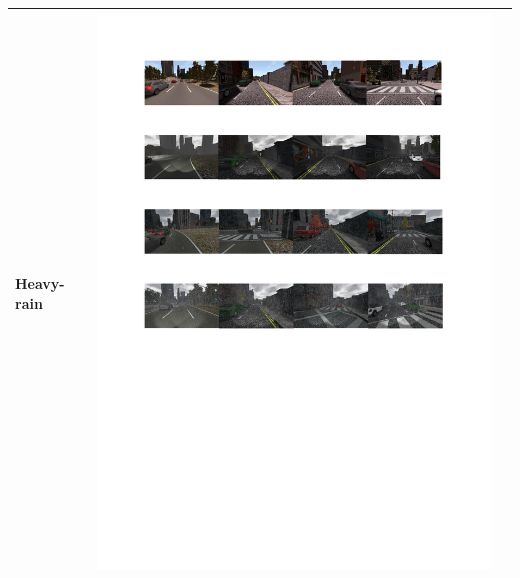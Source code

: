 \documentclass{svproc}
\begin{document}
\begin{table}[!t]
\begin{tabular}{|C{1.5cm}|c|C{8.5cm}|}
	Heavy- rain & \begin{minipage}{.9\textwidth}\includegraphics[scale=.5,trim=2cm 12.5cm 2cm 14.3cm,clip]{examples.pdf}\end{minipage} \\ \hline
	\end{tabular}
\end{table}
\end{document}
